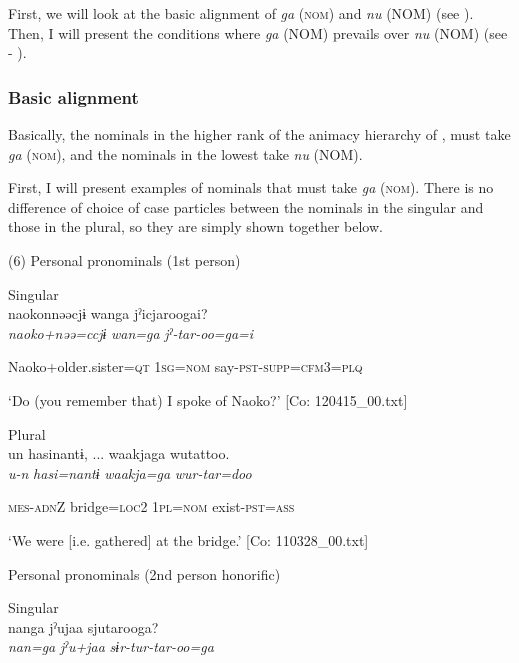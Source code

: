   First, we will look at the basic alignment of \textit{ga} (\textsc{nom}) and \textit{nu} (NOM) (see ). Then, I will present the conditions where \textit{ga} (NOM) prevails over \textit{nu} (NOM) (see  - ).

\subsubsection{Basic alignment}

Basically, the nominals in the higher rank of the animacy hierarchy of , must take \textit{ga} (\textsc{nom}), and the nominals in the lowest take \textit{nu} (NOM).

First, I will present examples of nominals that must take \textit{ga} (\textsc{nom}). There is no difference of choice of case particles between the nominals in the singular and those in the plural, so they are simply shown together below.

(6)  Personal pronominals (1st person)

 \ea Singular\\
{\TM}
\gll  naokonnəəcjɨ  wanga  jˀicjaroogai?\\

      \textit{naoko+nəə=ccjɨ}  \textit{wan=ga}  \textit{jˀ-tar-oo=ga=i}

      Naoko+older.sister=\textsc{qt}  1\textsc{sg}=\textsc{nom}  say-\textsc{pst}-\textsc{supp}=\textsc{cfm}3=\textsc{plq}

\glt ‘Do (you remember that) I spoke of Naoko?’ [Co: 120415\_00.txt]
\z

 \ex Plural\\
{\TM}
\gll  un  hasinantɨ, ...  waakjaga  wutattoo.\\

      \textit{u-n}  \textit{hasi=nantɨ}  \textit{waakja=ga}  \textit{wur-tar=doo}

      \textsc{mes}-\textsc{adn}Z  bridge=\textsc{loc}2  1\textsc{pl}=\textsc{nom}  exist-\textsc{pst}=\textsc{ass}

\glt ‘We were [i.e. gathered] at the bridge.’ [Co: 110328\_00.txt]
\z

  Personal pronominals (2nd person honorific)

 \ex Singular\\
{\TM}
\gll  nanga  jˀujaa  sjutarooga?\\

      \textit{nan=ga}  \textit{jˀu+jaa}  \textit{sɨr-tur-tar-oo=ga}

